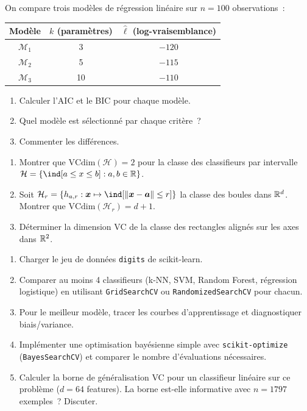 \begin{exercice}
On compare trois mod\`eles de r\'egression lin\'eaire sur $n = 100$
observations~:
\begin{center}
\begin{tabular}{ccc}
\toprule
Mod\`ele & $k$ (param\`etres) & $\hat{\ell}$ (log-vraisemblance) \\
\midrule
$\mathcal{M}_1$ & 3 & $-120$ \\
$\mathcal{M}_2$ & 5 & $-115$ \\
$\mathcal{M}_3$ & 10 & $-110$ \\
\bottomrule
\end{tabular}
\end{center}
\begin{enumerate}
  \item Calculer l'AIC et le BIC pour chaque mod\`ele.
  \item Quel mod\`ele est s\'electionn\'e par chaque crit\`ere~?
  \item Commenter les diff\'erences.
\end{enumerate}
\end{exercice}

\begin{exercice}
\begin{enumerate}
  \item Montrer que $\text{VCdim}(\mathcal{H}) = 2$ pour la classe des
    classifieurs par intervalle $\mathcal{H} = \{\ind[a \leq x \leq b] :
    a, b \in \R\}$.
  \item Soit $\mathcal{H}_r = \{h_{a,r} : \bm{x} \mapsto
    \ind[\norm{\bm{x} - \bm{a}} \leq r]\}$ la classe des boules dans
    $\mathbb{R}^d$. Montrer que $\text{VCdim}(\mathcal{H}_r) = d + 1$.
  \item D\'eterminer la dimension VC de la classe des rectangles align\'es
    sur les axes dans $\mathbb{R}^2$.
\end{enumerate}
\end{exercice}

\begin{exercice}
\begin{enumerate}
  \item Charger le jeu de donn\'ees \texttt{digits} de scikit-learn.
  \item Comparer au moins 4 classifieurs (k-NN, SVM, Random Forest,
    r\'egression logistique) en utilisant \texttt{GridSearchCV} ou
    \texttt{RandomizedSearchCV} pour chacun.
  \item Pour le meilleur mod\`ele, tracer les courbes d'apprentissage
    et diagnostiquer biais/variance.
  \item Impl\'ementer une optimisation bay\'esienne simple avec
    \texttt{scikit-optimize} (\texttt{BayesSearchCV}) et comparer
    le nombre d'\'evaluations n\'ecessaires.
  \item Calculer la borne de g\'en\'eralisation VC pour un classifieur
    lin\'eaire sur ce probl\`eme ($d = 64$ features). La borne est-elle
    informative avec $n = 1797$ exemples~? Discuter.
\end{enumerate}
\end{exercice}
